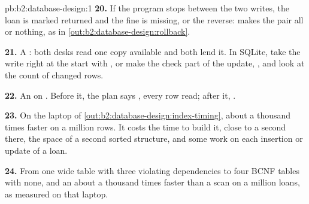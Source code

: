 \begin{solution}{pb:b2:database-design:1}
\textbf{20.} If the program stops between the two writes, the loan is marked returned and the fine is missing, or the
reverse:  makes the pair all or nothing, as in \cref{out:b2:database-design:rollback}.

\textbf{21.} A : both desks read one copy available and both lend it. In SQLite, take the write right at the
start with , or make the check part of the update, , and look at the count of changed rows.

\textbf{22.} An  on . Before it, the plan says , every row read; after it,
.

\textbf{23.} On the laptop of \cref{out:b2:database-design:index-timing}, about a thousand times faster on a million rows.
It costs the time to build it, close to a second there, the space of a second sorted structure, and some work on each
insertion or update of a loan.

\textbf{24.} From one wide table with three violating dependencies to four BCNF tables with none, and an  about a
thousand times faster than a scan on a million loans, as measured on that laptop.
\end{solution}

